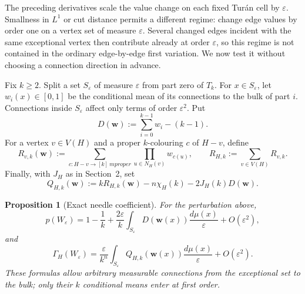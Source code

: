 \documentclass[11pt]{article}
\newtheorem{proposition}[theorem]{Proposition}
\begin{document}
The preceding derivatives scale the value change on each fixed Tur\'an cell
by $\varepsilon$.  Smallness in $L^1$ or cut distance permits a different
regime: change edge values by order one on a vertex set of measure
$\varepsilon$.  Several changed edges incident with the same exceptional
vertex then contribute already at order $\varepsilon$, so this regime is not
contained in the ordinary edge-by-edge first variation.  We now test it
without choosing a connection direction in advance.

Fix $k\geq2$.  Split a set $S_\varepsilon$ of measure $\varepsilon$ from
part zero of $T_k$.  For $x\in S_\varepsilon$, let
$w_i(x)\in[0,1]$ be the conditional mean of its connections to the bulk of
part $i$.  Connections inside $S_\varepsilon$ affect only terms of order
$\varepsilon^2$.  Put
\[
 D(\boldsymbol w):=\sum_{i=0}^{k-1}w_i-(k-1).
\]
For a vertex $v\in V(H)$ and a proper $k$-colouring $c$ of $H-v$, define
\[
 R_{v,k}(\boldsymbol w)
 :=\sum_{c:H-v\longrightarrow[k]\ {
m proper}}
   \prod_{u\in N_H(v)}w_{c(u)},
 \qquad
 R_{H,k}:=\sum_{v\in V(H)}R_{v,k}.
\]
Finally, with $J_H$ as in Section~2, set
\begin{equation}
 Q_{H,k}(\boldsymbol w)
 :=kR_{H,k}(\boldsymbol w)-n\chi_H(k)
   -2J_H(k)D(\boldsymbol w).
 \label{eq:needle-Q}
\end{equation}

\begin{proposition}[Exact needle coefficient]\label{prop:needle}
For the perturbation above,
\[
 p(W_\varepsilon)
 =1-\frac1k+\frac{2\varepsilon}{k}
   \int_{S_\varepsilon}D(\boldsymbol w(x))
       \frac{d\mu(x)}{\varepsilon}
   +O(\varepsilon^2),
\]
and
\[
 \Gamma_H(W_\varepsilon)
 =\frac{\varepsilon}{k^n}
   \int_{S_\varepsilon}Q_{H,k}(\boldsymbol w(x))
       \frac{d\mu(x)}{\varepsilon}
   +O(\varepsilon^2).
\]
These formulas allow arbitrary measurable connections from the exceptional
set to the bulk; only their $k$ conditional means enter at first order.
\end{proposition}
\end{document}

